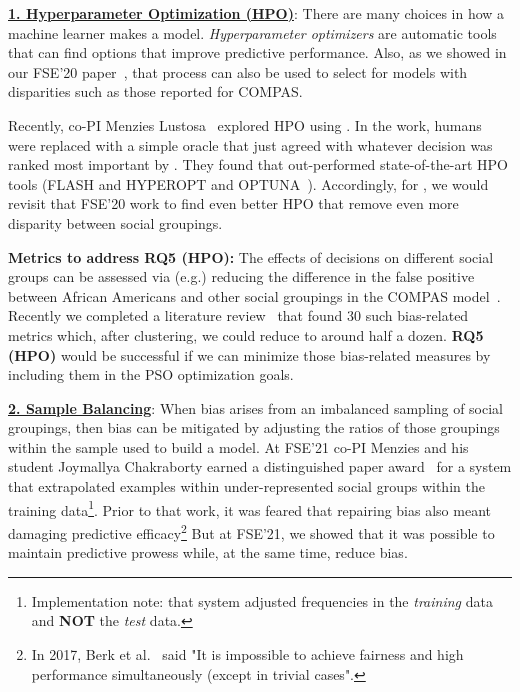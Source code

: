 \noindent\underline{\bf 1. Hyperparameter Optimization (HPO)}: 
 There are many choices in how a machine learner makes a model.
 {\em Hyperparameter optimizers} are automatic tools that can    find options that 
 improve predictive
 performance. Also, as we showed in our FSE'20 paper~\cite{Chakraborty_2020},
 that     process can also be used to select for   models with
 disparities such as those reported for
 COMPAS.

 Recently, 
 co-PI Menzies    Lustosa~\cite{lustosa22}   explored HPO using {}.  
 In the work, humans were replaced with a simple oracle that just agreed with whatever decision was ranked most important by {}. 
 They found that {} out-performed state-of-the-art HPO tools 
 (FLASH and HYPEROPT and OPTUNA~\cite{bergstra2015hyperopt,nair18,akiba2019optuna}). 
 Accordingly,  for , we would
   revisit that FSE'20 work to  find even better HPO that remove even more disparity between social groupings. 

  {\bf   Metrics to address RQ5 (HPO):} The effects of decisions
on different social groups can be assessed via (e.g.) reducing the 
  difference in the false positive between African Americans and other social groupings in
 the COMPAS model~\cite{Machine_Bias}. Recently we completed a literature review~\cite{Majumder21}
 that found 30 such bias-related metrics which, after   clustering, we could reduce to around half a dozen.   {\bf RQ5 (HPO)} would be successful
 if   we can minimize those bias-related measures by including
 them in the PSO optimization goals.
 
\noindent\underline{\bf 2. Sample Balancing}: 
  When bias arises from an imbalanced
  sampling of   social groupings, then bias can be mitigated by
  adjusting the ratios of those   groupings within the sample
  used to build a model.
  At  FSE'21 co-PI Menzies
 and his student  Joymallya Chakraborty earned a distinguished paper award~\cite{fse21} 
 for a system that extrapolated examples within under-represented social groups within the training data\footnote{Implementation note: that system adjusted frequencies in the 
 {\em training} data and {\bf NOT} the {\em test} data.}.
  Prior to that work, it was  feared   that repairing bias also meant damaging predictive efficacy\footnote{
In 2017,    Berk et al.~\cite{berk2017fairness}   said
"It is impossible to achieve fairness and high performance simultaneously (except in trivial cases".}
But at FSE'21, we    showed that it was   possible to maintain predictive prowess while, at the same time,  reduce bias.

